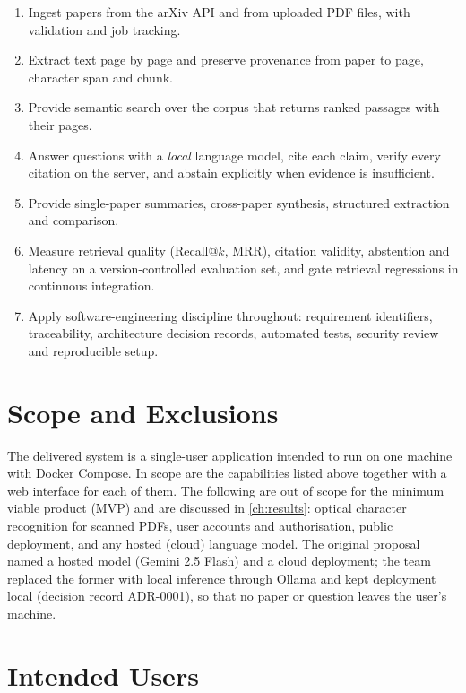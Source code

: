 \begin{enumerate}[label=O\arabic*.]
  \item Ingest papers from the arXiv API and from uploaded PDF files, with validation and job tracking.
  \item Extract text page by page and preserve provenance from paper to page, character span and chunk.
  \item Provide semantic search over the corpus that returns ranked passages with their pages.
  \item Answer questions with a \emph{local} language model, cite each claim, verify every citation on the server,
        and abstain explicitly when evidence is insufficient.
  \item Provide single-paper summaries, cross-paper synthesis, structured extraction and comparison.
  \item Measure retrieval quality (Recall@$k$, MRR), citation validity, abstention and latency on a
        version-controlled evaluation set, and gate retrieval regressions in continuous integration.
  \item Apply software-engineering discipline throughout: requirement identifiers, traceability, architecture
        decision records, automated tests, security review and reproducible setup.
\end{enumerate}

\section{Scope and Exclusions}

The delivered system is a single-user application intended to run on one machine with Docker Compose. In scope are
the capabilities listed above together with a web interface for each of them. The following are out of scope for
the minimum viable product (MVP) and are discussed in \autoref{ch:results}: optical character recognition for
scanned PDFs, user accounts and authorisation, public deployment, and any hosted (cloud) language model. The
original proposal named a hosted model (Gemini 2.5 Flash) and a cloud deployment; the team replaced the former with
local inference through Ollama and kept deployment local (decision record ADR-0001), so that no paper or question
leaves the user's machine.

\section{Intended Users}

